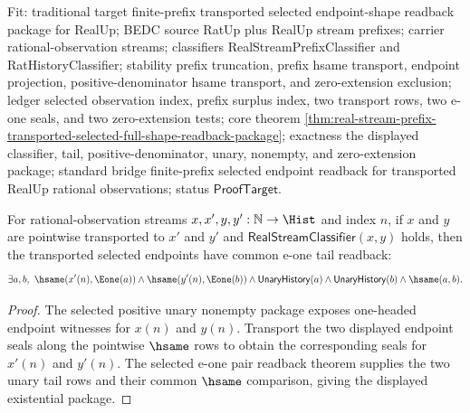 Fit: traditional target finite-prefix transported selected endpoint-shape
readback package for RealUp; BEDC source RatUp plus RealUp stream prefixes;
carrier rational-observation streams; classifiers RealStreamPrefixClassifier
and RatHistoryClassifier; stability prefix truncation, prefix hsame transport,
endpoint projection, positive-denominator hsame transport, and zero-extension
exclusion; ledger selected observation index, prefix surplus index, two
transport rows, two e-one seals, and two zero-extension tests; core theorem
\autoref{thm:real-stream-prefix-transported-selected-full-shape-readback-package};
exactness the displayed classifier, tail, positive-denominator, unary, nonempty,
and zero-extension package; standard bridge finite-prefix selected endpoint
readback for transported RealUp rational observations; status
$\mathsf{ProofTarget}$.

\begin{theorem}
\label{thm:real-stream-classifier-transport-selected-endpoint-common-e1-tail-readback}
For rational-observation streams $x,x',y,y':\mathbb{N}\to\Hist$ and index $n$,
if $x$ and $y$ are pointwise transported to $x'$ and $y'$ and
$\mathsf{RealStreamClassifier}(x,y)$ holds, then the transported selected
endpoints have common e-one tail readback:
$$
\exists a,b,\ \hsame(x'(n),\Eone(a))\land \hsame(y'(n),\Eone(b))\land
\mathsf{UnaryHistory}(a)\land \mathsf{UnaryHistory}(b)\land \hsame(a,b).
$$
\end{theorem}
\begin{proof}
The selected positive unary nonempty package exposes one-headed endpoint
witnesses for $x(n)$ and $y(n)$. Transport the two displayed endpoint seals
along the pointwise $\hsame$ rows to obtain the corresponding seals for
$x'(n)$ and $y'(n)$. The selected e-one pair readback theorem supplies the two
unary tail rows and their common $\hsame$ comparison, giving the displayed
existential package.
\end{proof}

